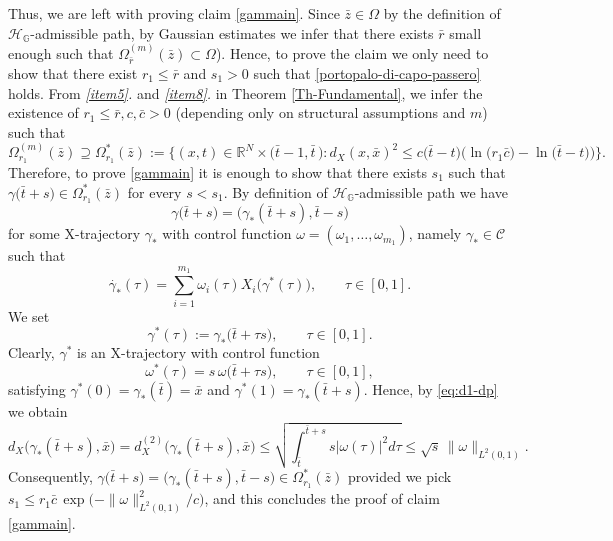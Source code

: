 \documentclass[11pt,a4paper]{article}
\numberwithin{equation}{section}
\def \rn {{\mathbb {R}}^{N}}
\def \GG {{\mathbb{G}}}
\def \ti {\times}
\def \H {\mathscr{H}_\GG}
\def \t {{\tau}}
\def \O {{\Omega}}
\begin{document}
{{Thus, we are left with proving claim \eqref{gammain}. Since $\bar z\in\O$ by the definition of $\H$-admissible path, by Gaussian estimates we infer that there exists $\bar r$ small enough such that $\O^{(m)}_{\bar r}(\bar z)\subset\O$). Hence, to prove the claim we only need to show that there exist $r_1\leq \bar r$ and $s_1>0$ such that \eqref{portopalo-di-capo-passero} holds. From \emph{\ref{item5}.} and \emph{\ref{item8}.} in Theorem \ref{Th-Fundamental}, we infer the existence of $r_1\leq \bar r,c,\bar c>0$ (depending only on structural assumptions and $m$) such that 
\begin{equation}
	\O_{r_1}^{(m)}(\bar z) \supseteq \O_{r_1}^{*}(\bar z):=\Bigg\{(x,t)\in \rn\ti \big(\bar t-1,\bar t\,\big) : d_X(x,\bar x)^2\leq c \big(\bar t-t\big)\Big(\ln \big(r_1\bar c\big)-\ln\big(\bar t-t\big)\Big)\Bigg\}.
\end{equation}
Therefore, to prove \eqref{gammain} it is enough to show that there exists $s_1$ such that $\gamma \big(\bar t + s\big)\in \O^{*}_{r_1}(\bar z)$ for every $s<s_1$. By definition of $\H$-admissible path we have 
\begin{equation}
	\gamma\big(\bar t+s\big) =  \big(\gamma_*(\bar t + s),\bar t-s\big)
\end{equation}
for some  X-trajectory $\gamma_*$ with control function $\omega=(\omega_1,\ldots, \omega_{m_1})$, namely $\gamma_*\in \mathcal{C}$ such that
\begin{equation}	
	\dot{\gamma_*}(\t)=\sum_{i=1}^{m_1}\omega_i(\t)X_i\big(\gamma^*(\t)\big),\qquad \t\in [0,1].
\end{equation}
We set 
\begin{equation}
	\gamma^*(\t):=\gamma_*\big(\bar t+\t s\big),\qquad \t \in [0,1].
\end{equation}
Clearly, $\gamma^*$ is an X-trajectory with control function
\begin{equation}
	\omega^*(\t)=s\,\omega\big(\bar t+\t s\big),\qquad \t\in[0,1],
\end{equation}
satisfying $\gamma^*(0)=\gamma_*(\bar t)=\bar x$ and $\gamma^*(1)=\gamma_*(\bar t + s)$. Hence, by \eqref{eq:d1-dp} we obtain
\begin{equation}
	d_X\big(\gamma_*(\bar t + s),\bar x\big) =d^{(2)}_X\big(\gamma_*(\bar t + s),\bar x\big)\leq \sqrt{\int_{\bar t}^{\bar t +s}s |\omega(\t)|^2d\t}\leq \sqrt{s}\,\|\omega\|_{L^2(0,1)}.
\end{equation}
Consequently, $\gamma\big(\bar t+s\big)=\big(\gamma_*(\bar t + s), \bar t-s\big)\in \O^{*}_{r_1}(\bar z)$ provided we pick $s_1\leq r_1\bar c\, \exp\Big({-\|\omega\|_{L^2(0,1)}^2/c}\Big)$, and this concludes the proof of claim \eqref{gammain}. 
 

}}
\end{document}
